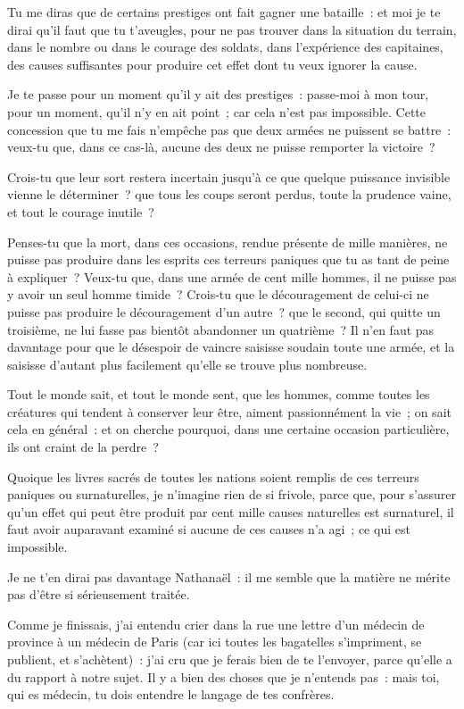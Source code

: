 \documentclass[french,twoside]{book} %
\newcommand{\dateline}[1]{\medskip{\RaggedLeft{#1}\par}\bigskip}
\begin{document}
Tu me diras que de certains prestiges ont fait gagner une bataille : et moi je te dirai qu’il faut que tu t’aveugles, pour ne pas trouver dans la situation du terrain, dans le nombre ou dans le courage des soldats, dans l’expérience des capitaines, des causes suffisantes pour produire cet effet dont tu veux ignorer la cause.\par
Je te passe pour un moment qu’il y ait des prestiges : passe-moi à mon tour, pour un moment, qu’il n’y en ait point ; car cela n’est pas impossible. Cette concession que tu me fais n’empêche pas que deux armées ne puissent se battre : veux-tu que, dans ce cas-là, aucune des deux ne puisse remporter la victoire ?\par
Crois-tu que leur sort restera incertain jusqu’à ce que quelque puissance invisible vienne le déterminer ? que tous les coups seront perdus, toute la prudence vaine, et tout le courage inutile ?\par
Penses-tu que la mort, dans ces occasions, rendue présente de mille manières, ne puisse pas produire dans les esprits ces terreurs paniques que tu as tant de peine à expliquer ? Veux-tu que, dans une armée de cent mille hommes, il ne puisse pas y avoir un seul homme timide ? Crois-tu que le découragement de celui-ci ne puisse pas produire le découragement d’un autre ? que le second, qui quitte un troisième, ne lui fasse pas bientôt abandonner un quatrième ? Il n’en faut pas davantage pour que le désespoir de vaincre saisisse soudain toute une armée, et la saisisse d’autant plus facilement qu’elle se trouve plus nombreuse.\par
Tout le monde sait, et tout le monde sent, que les hommes, comme toutes les créatures qui tendent à conserver leur être, aiment passionnément la vie ; on sait cela en général : et on cherche pourquoi, dans une certaine occasion particulière, ils ont craint de la perdre ?\par
Quoique les livres sacrés de toutes les nations soient remplis de ces terreurs paniques ou surnaturelles, je n’imagine rien de si frivole, parce que, pour s’assurer qu’un effet qui peut être produit par cent mille causes naturelles est surnaturel, il faut avoir auparavant examiné si aucune de ces causes n’a agi ; ce qui est impossible.\par
Je ne t’en dirai pas davantage Nathanaël : il me semble que la matière ne mérite pas d’être si sérieusement traitée.\par

\dateline{De Paris, le 20 de la lune de Chahban, 1720.}
 Comme je finissais, j’ai entendu crier dans la rue une lettre d’un médecin de province à un médecin de Paris (car ici toutes les bagatelles s’impriment, se publient, et s’achètent) : j’ai cru que je ferais bien de te l’envoyer, parce qu’elle a du rapport à notre sujet. Il y a bien des choses que je n’entends pas : mais toi, qui es médecin, tu dois entendre le langage de tes confrères.
\end{document}

